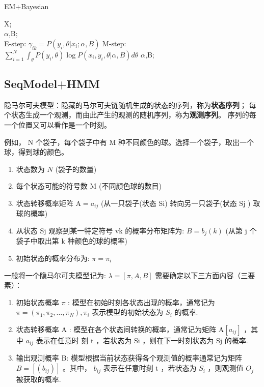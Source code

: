 \documentclass[UTF8]{ctexart}
\numberwithin{equation}{section}
\begin{document}
\begin{algorithm}[htb]
\caption{EM+Bayesian}
\label{alg:EM+B}
\begin{algorithmic}[1]
\REQUIRE
X; \\
\ENSURE 
$\alpha$,B; \\
\REPEAT 
\STATE E-step: $\gamma_{ik}=P(y_i,\theta|x_i;\alpha,B)$
\STATE M-step: $\sum_{i=1}^N\int_{\theta} P(y_i,\theta) \log P(x_i,y_i,\theta|\alpha,B)d{\theta}$
\UNTIL 
\RETURN $\alpha$,B;
\end{algorithmic}
\end{algorithm}


\subsection{SeqModel+HMM}
隐马尔可夫模型：隐藏的马尔可夫链随机生成的状态的序列，称为\textbf{状态序列}；
每个状态生成一个观测，而由此产生的观测的随机序列，称为\textbf{观测序列}。
序列的每一个位置又可以看作是一个时刻。

例如， $\mathrm{N}$ 个袋子，每个袋子中有 $\mathrm{M}$ 种不同颜色的球。选择一个袋子，取出一个球，得到球的颜色。
\begin{enumerate}
    \item 状态数为 $N$ (袋子的数量)
    \item 每个状态可能的符号数 $\mathrm{M}$ (不同颜色球的数目)
    \item 状态转移概率矩阵 $\mathrm{A}=a_{i j}$ (从一只袋子(状态 Si) 转向另一只袋子(状态 $\mathrm{Sj}$ ) 取球的概率)
    \item 从状态 $\mathrm{Sj}$ 观察到某一特定符号 $\mathrm{vk}$ 的概率分布矩阵为: $B=b_{j}(k)$ (从第 $\mathrm{j}$ 个袋子中取出第 $\mathrm{k}$ 种颜色的球的概率)
    \item 初始状态的概率分布为: $\pi=\pi_{i}$
\end{enumerate}

一般将一个隐马尔可夫模型记为: $\lambda=[\pi, A, B]$
需要确定以下三方面内容（三要素）：
\begin{enumerate}
    \item 初始状态概率 $\pi$ : 模型在初始时刻各状态出现的概率，通常记为 $\pi=\left(\pi_{1}, \pi_{2}, \ldots, \pi_{N}\right), \pi_{i}$ 表示模型的初始状态为 $S_{i}$ 的概率.
    \item 状态转移概率 $\mathrm{A}$ : 模型在各个状态间转换的概率，通常记为矩阵 $\mathrm{A}\left[a_{i j}\right]$ ，其中 $a_{i j}$ 表示在任意时 刻 $\mathrm{t}$ ，若状态为 $\mathrm{Si}$ ，则在下一时刻状态为 $\mathrm{Sj}$ 的概率.
    \item 输出观测概率 B: 模型根据当前状态获得各个观测值的概率通常记为矩阵 $B=\left[\left(b_{i j}\right)\right]$ 。其中， $b_{i j}$ 表示在任意时刻 $\mathrm{t}$ ，若状态为 $S_{i}$ ，则观测值 $O_{j}$ 被获取的概率.
\end{enumerate}
\end{document}

